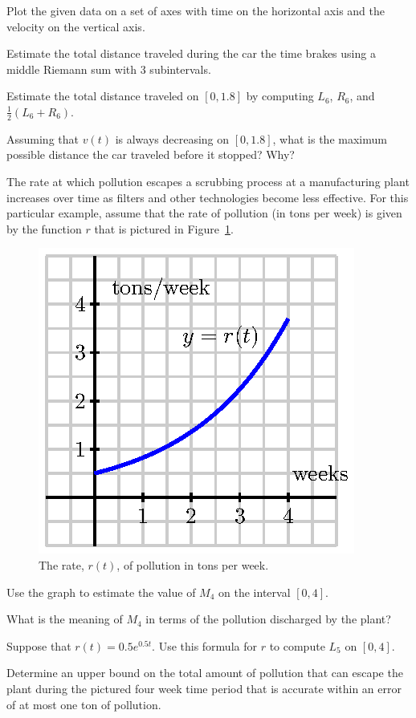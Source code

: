 \begin{exercises}
\begin{center}
\begin{tabular}{|l|c|c|c|c|c|c|c|}
\hline
\end{tabular}
\end{center}
\ba
	\item Plot the given data on a set of axes with time on the horizontal axis and the velocity on the vertical axis.
	\item Estimate the total distance traveled during the car the time brakes using a middle Riemann sum with 3 subintervals.
	\item Estimate the total distance traveled on $[0,1.8]$ by computing $L_6$, $R_6$, and $\frac{1}{2}(L_6 + R_6)$.
	\item Assuming that $v(t)$ is always decreasing on $[0,1.8]$, what is the maximum possible distance the car traveled before it stopped?  Why?
\ea
	\item The rate at which pollution escapes a scrubbing process at a manufacturing plant increases over time as filters and other technologies become less effective.  For this particular example, assume that the rate of pollution (in tons per week) is given by the function $r$ that is pictured in Figure~\ref{F:4.2.Ez4}.
\begin{figure}[h]
\begin{center}
\includegraphics{figures/4_2_Ez4.eps}
\caption{The rate, $r(t)$, of pollution in tons per week.} \label{F:4.2.Ez4}
\end{center}
\end{figure} 
	\ba
		\item Use the graph to estimate the value of $M_4$ on the interval $[0,4]$.
		\item What is the meaning of $M_4$ in terms of the pollution discharged by the plant?
		\item Suppose that $r(t) = 0.5 e^{0.5t}$.  Use this formula for $r$ to compute $L_5$ on $[0,4]$.  
		\item Determine an upper bound on the total amount of pollution that can escape the plant during the pictured four week time period that is accurate within an error of at most one ton of pollution.
	\ea
\end{exercises}
\afterexercises
